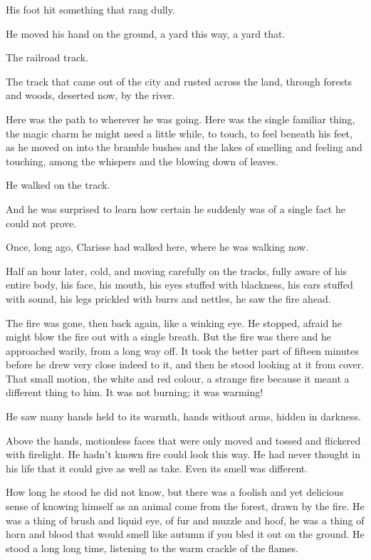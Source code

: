 \documentclass[11pt,openany]{book}
\begin{document}
His foot hit something that rang dully.

He moved his hand on the ground, a yard this way, a yard that.

The railroad track.

The track that came out of the city and rusted across the land, through forests and woods, deserted now, by the river.

Here was the path to wherever he was going. Here was the single familiar thing, the magic charm he might need a little while, to touch, to feel beneath his feet, as he moved on into the bramble bushes and the lakes of smelling and feeling and touching, among the whispers and the blowing down of leaves.

He walked on the track.

And he was surprised to learn how certain he suddenly was of a single fact he could not prove.

Once, long ago, Clarisse had walked here, where he was walking now.

Half an hour later, cold, and moving carefully on the tracks, fully aware of his entire body, his face, his mouth, his eyes stuffed with blackness, his ears stuffed with sound, his legs prickled with burrs and nettles, he saw the fire ahead.

The fire was gone, then back again, like a winking eye. He stopped, afraid he might blow the fire out with a single breath. But the fire was there and he approached warily, from a long way off. It took the better part of fifteen minutes before he drew very close indeed to it, and then he stood looking at it from cover. That small motion, the white and red colour, a strange fire because it meant a different thing to him. It was not burning; it was warming!

He saw many hands held to its warmth, hands without arms, hidden in darkness.

Above the hands, motionless faces that were only moved and tossed and flickered with firelight. He hadn't known fire could look this way. He had never thought in his life that it could give as well as take. Even its smell was different.

How long he stood he did not know, but there was a foolish and yet delicious sense of knowing himself as an animal come from the forest, drawn by the fire. He was a thing of brush and liquid eye, of fur and muzzle and hoof, he was a thing of horn and blood that would smell like autumn if you bled it out on the ground. He stood a long long time, listening to the warm crackle of the flames.
\end{document}
